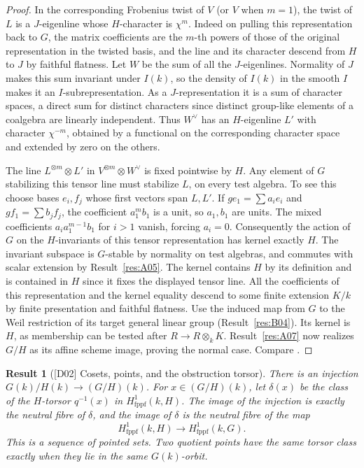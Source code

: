 \documentclass[11pt,a4paper,openany,oneside]{book}
\theoremstyle{resultstyle}
\newtheorem{statement}{Result}[chapter]
\newenvironment{result}[2]{\clubpenalty=10000\begin{statement}[\textnormal{[#1]} #2]\leavevmode\label{res:#1}\ignorespaces}{\end{statement}}
\theoremstyle{definition}
\numberwithin{equation}{chapter}
\begin{document}
\begin{proof}
In the corresponding Frobenius twist of \(V\) (or \(V\)
when \(m=1\)), the twist of \(L\) is a \(J\)-eigenline
whose \(H\)-character is \(\chi^m\).
Indeed on pulling this representation back to \(G\),
the matrix coefficients are the \(m\)-th powers of those
of the original representation in the twisted basis, and the
line and its character descend from \(H\) to \(J\) by faithful
flatness. Let \(W\) be the sum of all the \(J\)-eigenlines.
Normality of \(J\) makes this sum invariant under \(I(k)\),
so the density of \(I(k)\) in the smooth \(I\) makes it
an \(I\)-subrepresentation. As a \(J\)-representation it is
a sum of character spaces, a direct sum for distinct characters
since distinct group-like elements of a coalgebra are linearly
independent. Thus \(W^\vee\) has an \(H\)-eigenline \(L'\)
with character \(\chi^{-m}\), obtained by a functional on the
corresponding character space and extended by zero on the others.

The line \(L^{\otimes m}\otimes L'\) in
\(V^{\otimes m}\otimes W^\vee\) is fixed pointwise by \(H\).
Any element of \(G\) stabilizing this tensor line must stabilize
\(L\), on every test algebra. To see this choose bases \(e_i,f_j\)
whose first vectors span \(L,L'\). If \(g e_1=\sum a_i e_i\)
and \(g f_1=\sum b_j f_j\), the coefficient \(a_1^m b_1\)
is a unit, so \(a_1,b_1\) are units. The mixed coefficients
\(a_i a_1^{m-1}b_1\) for \(i>1\) vanish, forcing \(a_i=0\).
Consequently the action of \(G\) on the \(H\)-invariants of
this tensor representation has kernel exactly \(H\).
The invariant subspace is \(G\)-stable by normality on
test algebras, and commutes with scalar extension by
Result~\ref{res:A05}. The kernel contains \(H\) by its definition
and is contained in \(H\) since it fixes the displayed tensor
line. All the coefficients of this representation and the
kernel equality descend to some finite extension \(K/k\)
by finite presentation and faithful flatness. Use the induced
map from \(G\) to the Weil restriction of its target general
linear group (Result~\ref{res:B04}). Its kernel is \(H\),
as membership can be tested after \(R\to R\otimes_k K\).
Result~\ref{res:A07} now realizes \(G/H\) as its affine scheme
image, proving the normal case. Compare
\cite[Propositions 5.15--5.18 and Section 7.e]{milne}.
\end{proof}

\begin{result}{D02}{Cosets, points, and the obstruction torsor}
There is an injection \(G(k)/H(k)\to(G/H)(k)\). For \(x\in(G/H)(k)\), let \(\delta(x)\) be the class of the \(H\)-torsor \(q^{-1}(x)\) in \(H^1_{\mathrm{fppf}}(k,H)\). The image of the injection is exactly the neutral fibre of \(\delta\), and the image of \(\delta\) is the neutral fibre of the map
\[
 H^1_{\mathrm{fppf}}(k,H)\longrightarrow H^1_{\mathrm{fppf}}(k,G).
\]
This is a sequence of pointed sets. Two quotient points have the same torsor class exactly when they lie in the same \(G(k)\)-orbit.
\end{result}
\end{document}
